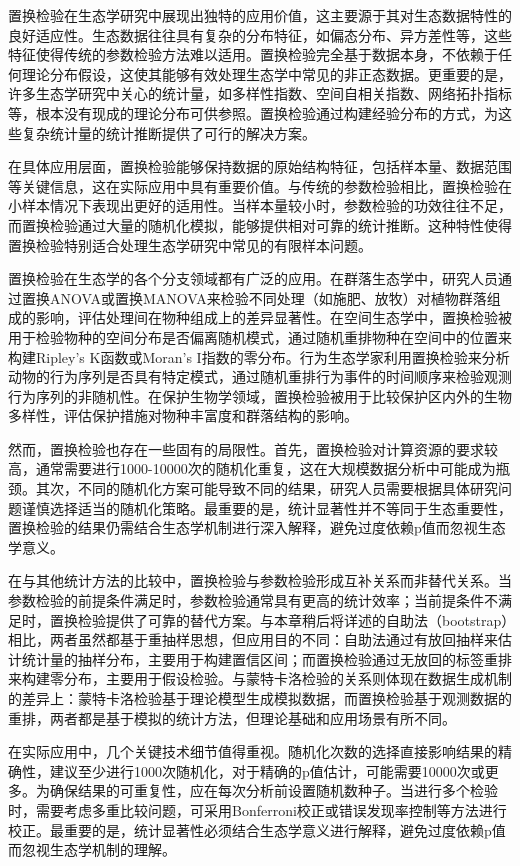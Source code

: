 \documentclass[
  twoside,12pt,fontset=none]{ctexbook}
\begin{document}
置换检验在生态学研究中展现出独特的应用价值，这主要源于其对生态数据特性的良好适应性。生态数据往往具有复杂的分布特征，如偏态分布、异方差性等，这些特征使得传统的参数检验方法难以适用。置换检验完全基于数据本身，不依赖于任何理论分布假设，这使其能够有效处理生态学中常见的非正态数据。更重要的是，许多生态学研究中关心的统计量，如多样性指数、空间自相关指数、网络拓扑指标等，根本没有现成的理论分布可供参照。置换检验通过构建经验分布的方式，为这些复杂统计量的统计推断提供了可行的解决方案。

在具体应用层面，置换检验能够保持数据的原始结构特征，包括样本量、数据范围等关键信息，这在实际应用中具有重要价值。与传统的参数检验相比，置换检验在小样本情况下表现出更好的适用性。当样本量较小时，参数检验的功效往往不足，而置换检验通过大量的随机化模拟，能够提供相对可靠的统计推断。这种特性使得置换检验特别适合处理生态学研究中常见的有限样本问题。

置换检验在生态学的各个分支领域都有广泛的应用。在群落生态学中，研究人员通过置换ANOVA或置换MANOVA来检验不同处理（如施肥、放牧）对植物群落组成的影响，评估处理间在物种组成上的差异显著性。在空间生态学中，置换检验被用于检验物种的空间分布是否偏离随机模式，通过随机重排物种在空间中的位置来构建Ripley's K函数或Moran's I指数的零分布。行为生态学家利用置换检验来分析动物的行为序列是否具有特定模式，通过随机重排行为事件的时间顺序来检验观测行为序列的非随机性。在保护生物学领域，置换检验被用于比较保护区内外的生物多样性，评估保护措施对物种丰富度和群落结构的影响。

然而，置换检验也存在一些固有的局限性。首先，置换检验对计算资源的要求较高，通常需要进行1000-10000次的随机化重复，这在大规模数据分析中可能成为瓶颈。其次，不同的随机化方案可能导致不同的结果，研究人员需要根据具体研究问题谨慎选择适当的随机化策略。最重要的是，统计显著性并不等同于生态重要性，置换检验的结果仍需结合生态学机制进行深入解释，避免过度依赖p值而忽视生态学意义。

在与其他统计方法的比较中，置换检验与参数检验形成互补关系而非替代关系。当参数检验的前提条件满足时，参数检验通常具有更高的统计效率；当前提条件不满足时，置换检验提供了可靠的替代方案。与本章稍后将详述的自助法（bootstrap）相比，两者虽然都基于重抽样思想，但应用目的不同：自助法通过有放回抽样来估计统计量的抽样分布，主要用于构建置信区间；而置换检验通过无放回的标签重排来构建零分布，主要用于假设检验。与蒙特卡洛检验的关系则体现在数据生成机制的差异上：蒙特卡洛检验基于理论模型生成模拟数据，而置换检验基于观测数据的重排，两者都是基于模拟的统计方法，但理论基础和应用场景有所不同。

在实际应用中，几个关键技术细节值得重视。随机化次数的选择直接影响结果的精确性，建议至少进行1000次随机化，对于精确的p值估计，可能需要10000次或更多。为确保结果的可重复性，应在每次分析前设置随机数种子。当进行多个检验时，需要考虑多重比较问题，可采用Bonferroni校正或错误发现率控制等方法进行校正。最重要的是，统计显著性必须结合生态学意义进行解释，避免过度依赖p值而忽视生态学机制的理解。
\end{document}
